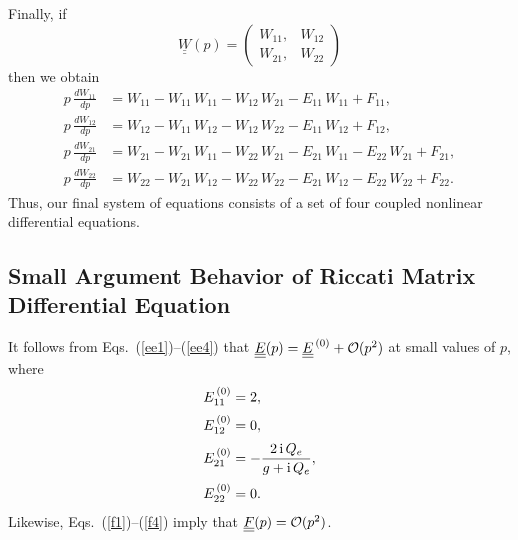 \documentclass[12pt,prb,aps]{revtex4-1}
\begin{document}
Finally, if 
\begin{equation}
\underline{\underline{W}}(p)= \left(\begin{array}{cc} W_{11},&W_{12}\\W_{21},&W_{22}\end{array}\right)
\end{equation}
then we obtain 
\begin{align}\label{err1}
p\,\frac{dW_{11}}{dp}  &= W_{11}  - W_{11}\,W_{11}-W_{12}\,W_{21}- E_{11}\,W_{11} + F_{11},\\[0.5ex]
p\,\frac{dW_{12}}{dp} &= W_{12} - W_{11}\,W_{12} - W_{12}\,W_{22} - E_{11}\,W_{12} + F_{12},\\[0.5ex]
p\,\frac{dW_{21}}{dp} &= W_{21} -W_{21}\,W_{11}- W_{22}\,W_{21} - E_{21}\,W_{11} - E_{22}\,W_{21} + F_{21},\\[0.5ex]
p\,\frac{dW_{22}}{dp} &= W_{22} -W_{21}\,W_{12}- W_{22}\,W_{22}- E_{21}\,W_{12} - E_{22}\,W_{22} + F_{22}.\label{err4}
\end{align}
Thus, our final system of equations consists of a set of four coupled nonlinear differential equations. 

\subsection{Small Argument Behavior of Riccati Matrix Differential Equation}
It follows from Eqs.~(\ref{ee1})--(\ref{ee4})  that  $\underline{\underline{E}}(p) = \underline{\underline{E}}^{\,(0)} + {\cal O}(p^2)$ at small values of $p$,
where 
\begin{align}
E_{11}^{\,(0)} &= 2,\\[0.5ex]
E_{12}^{\,(0)}&=0,\\[0.5ex]
E_{21}^{\,(0)} &= - \frac{2\,{\rm i}\,Q_e}{g+{\rm i}\,Q_e},\label{e210}\\[0.5ex]
E_{22}^{\,(0)}&= 0.
\end{align}
Likewise,  Eqs.~(\ref{f1})--(\ref{f4}) imply that $\underline{\underline{F}}(p) ={\cal O}(p^2)$.
\end{document}
